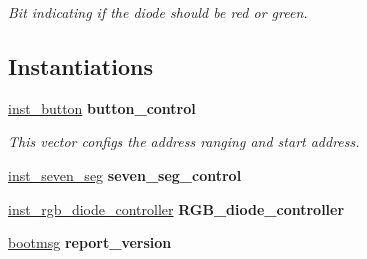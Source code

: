 \begin{DoxyCompactItemize}
\begin{DoxyCompactList}\small\item\em Bit indicating if the diode should be red or green. \end{DoxyCompactList}\end{DoxyCompactItemize}
\subsection*{Instantiations}
 \begin{DoxyCompactItemize}
\item 
\hypertarget{classbutton__and__hex__wrapper_1_1HID__wrapper_a065108a7c5c7c769b154fb69388d1a54}{\hyperlink{classbutton__and__hex__wrapper_1_1HID__wrapper_a065108a7c5c7c769b154fb69388d1a54}{inst\-\_\-button}  {\bfseries button\-\_\-control}   }\label{classbutton__and__hex__wrapper_1_1HID__wrapper_a065108a7c5c7c769b154fb69388d1a54}

\begin{DoxyCompactList}\small\item\em This vector configs the address ranging and start address. \end{DoxyCompactList}\item 
\hypertarget{classbutton__and__hex__wrapper_1_1HID__wrapper_a3241459a5ccd9bec9843d574e36baba6}{\hyperlink{classbutton__and__hex__wrapper_1_1HID__wrapper_a3241459a5ccd9bec9843d574e36baba6}{inst\-\_\-seven\-\_\-seg}  {\bfseries seven\-\_\-seg\-\_\-control}   }\label{classbutton__and__hex__wrapper_1_1HID__wrapper_a3241459a5ccd9bec9843d574e36baba6}

\item 
\hypertarget{classbutton__and__hex__wrapper_1_1HID__wrapper_a29c5d24baf8a0a823850fde077cda9f0}{\hyperlink{classbutton__and__hex__wrapper_1_1HID__wrapper_a29c5d24baf8a0a823850fde077cda9f0}{inst\-\_\-rgb\-\_\-diode\-\_\-controller}  {\bfseries R\-G\-B\-\_\-diode\-\_\-controller}   }\label{classbutton__and__hex__wrapper_1_1HID__wrapper_a29c5d24baf8a0a823850fde077cda9f0}

\item 
\hypertarget{classbutton__and__hex__wrapper_1_1HID__wrapper_acc6b2c6c9f85f90e08b01fb364af1a87}{\hyperlink{classbutton__and__hex__wrapper_1_1HID__wrapper_acc6b2c6c9f85f90e08b01fb364af1a87}{bootmsg}  {\bfseries report\-\_\-version}   }\label{classbutton__and__hex__wrapper_1_1HID__wrapper_acc6b2c6c9f85f90e08b01fb364af1a87}

\end{DoxyCompactItemize}


